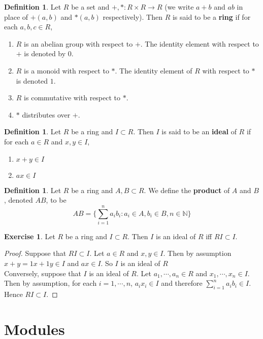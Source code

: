 \documentclass[12pt]{amsart}
\theoremstyle{definition}
\newtheorem{defn}[definition]{Definition}
\theoremstyle{remark}
\theoremstyle{definition}
\newtheorem{ex}[definition]{Exercise}
\newcommand{\N}{\mathbb{N}}
\begin{document}
	\begin{defn}
	Let $R$ be a set and $+, *: R \times R 				
	\rightarrow R$ (we write $a+b$ and 
	$ab$ in place of $+(a,b)$ and $*(a,b)$ respectively).
	Then $R$ is said to be a \textbf{ring} if for each 
	$a,b,c \in R$,
	\begin{enumerate}
	\item $R$ is an abelian group with respect to $+$.
	 The identity element with respect to $+$ is denoted
	 by $0$.
	\item $R$ is a monoid with respect to $*$. The  
	identity element of $R$ with respect to $*$ is denoted $1$. 
	\item $R$ is commutative with respect to $*$.
	\item $*$ distributes over $+$.
	\end{enumerate}
	\end{defn}
	
	\begin{defn}
	Let $R$ be a ring and $I \subset R$. Then $I$ is said 
	to be an \textbf{ideal} of $R$ if for each $a \in R$ and $x,y \in I$,
	\begin{enumerate}
	\item  $x + y \in I$
	\item  $ax \in I$
	\end{enumerate}
	\end{defn}
	
	\begin{defn}
	Let $R$ be a ring and $A,B \subset R$. We define the \textbf{product} of $A$ and $B$, denoted $AB$, to be $$AB = \bigg \{\sum_{i=1}^n a_ib_i: a_i \in A, b_i \in B, n \in \N \bigg \}$$
	\end{defn}	
	
	\begin{ex}
	Let $R$ be a ring and $I \subset R$. Then $I$ is an ideal of $R$ iff $RI \subset I$. 
	\end{ex}
	
	\begin{proof}
	Suppose that $RI \subset I$. Let $a \in R$ and $x,y \in I$. Then by assumption $x + y = 1x + 1y \in I$ and $ax \in I$. So $I$ is an ideal of $R$\\
	Conversely, suppose that $I$ is an ideal of $R$. Let $a_1, \cdots, a_n \in R$ and $x_1, \cdots, x_n \in I$. Then by assumption, for each $i = 1, \cdots, n$, $a_ix_i \in I$ and therefore $\sum\limits_{i=1}^n a_ib_i \in I$. Hence $RI \subset I$.
	\end{proof}
	
	\section{Modules}
	
\end{document}
